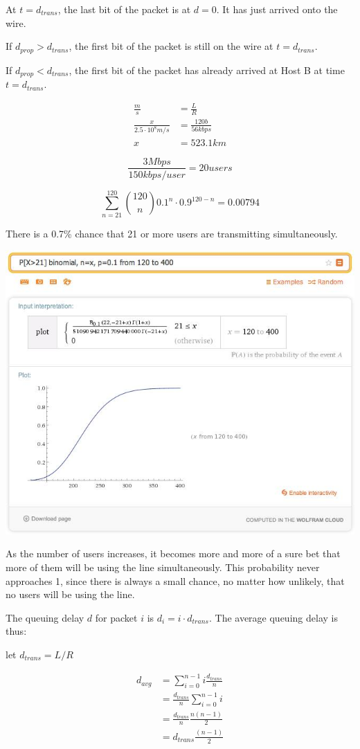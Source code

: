\documentclass[12pt]{article}
\begin{document}
\problemsub
At $t=d_{trans}$, the last bit of the packet is at $d=0$. It has just arrived onto the wire.

\problemsub
If $d_{prop}>d_{trans}$, the first bit of the packet is still on the wire at $t = d_{trans}$.

\problemsub
If $d_{prop}<d_{trans}$, the first bit of the packet has already arrived at Host B at time $t = d_{trans}$.

\problemsub
\begin{align*}
\displaystyle
\frac{m}{s} &= \frac{L}{R} \\
\frac{x}{2.5\cdot10^8 m/s} &= \frac{120 b}{56 kbps} \\
x &= 523.1 km
\end{align*}

\newpage
{}
\problemsub
$$
\frac{3 Mbps}{150 kbps/user} = 20 users
$$

\problemsub
$$
\sum_{n=21}^{120} {120 \choose n} 0.1^n \cdot 0.9^{120-n} = 0.00794
$$

There is a 0.7\% chance that 21 or more users are transmitting simultaneously.

\newpage
\problemsub
{}
\includegraphics[scale=0.75]{graph}

As the number of users increases, it becomes more and more of a sure bet that more of them will be using the line simultaneously. This probability never approaches 1, since there is always a small chance, no matter how unlikely, that no users will be using the line.

\newpage
{}
\problem

The queuing delay $d$ for packet $i$ is $d_{i} = i \cdot d_{trans}$. The average queuing delay is thus:

let $d_{trans} = L/R$

\begin{align*}
d_{avg} &= 
\sum_{i=0}^{n-1} i \frac{d_{trans}}{n} \\
&= \frac{d_{trans}}{n} \sum_{i=0}^{n-1} i \\
&= \frac{d_{trans}}{n} \frac{n(n-1)}{2} \\
&= d_{trans} \frac{(n-1)}{2} \\
\end{align*}
\end{document}
